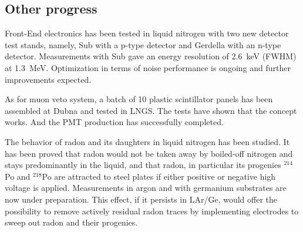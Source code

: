 \subsection{Other progress}
\label{sec:gerda:stat4}
Front-End electronics has been tested in liquid nitrogen with two new detector test stands, namely, Sub with a p-type detector and Gerdella with an n-type detector. Measurements with Sub gave an energy resolution of 2.6~keV (FWHM) at 1.3~MeV. Optimization in terms of noise performance is ongoing and further improvements expected.

As for muon veto system, a batch of 10 plastic scintillator panels has been assembled at Dubna and tested in LNGS. The tests have shown that the concept works. And the PMT production has successfully completed. 

The behavior of radon and its daughters in liquid nitrogen has been studied. It has been proved that radon would not be taken away by boiled-off nitrogen and stays predominantly in the liquid, and that radon, in particular its progenies $^{214}$Po and $^{218}$Po are attracted to steel plates if either positive or negative high voltage is applied. Measurements in argon and with germanium substrates are now under preparation. This effect, if it persists in LAr/Ge, would offer the possibility to remove actively residual radon traces by implementing electrodes to sweep out radon and their progenies. 


